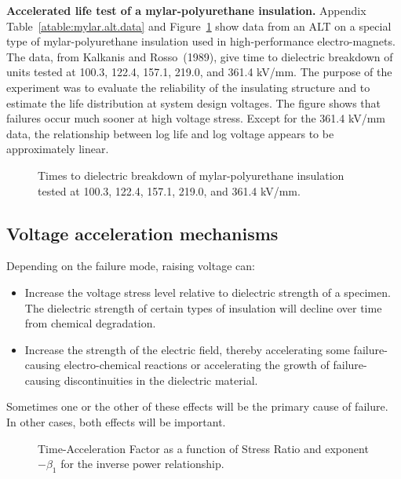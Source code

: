 \begin{example}{\bf Accelerated life test of a mylar-polyurethane
insulation.}
\label{example:mylar.voltage.data}
Appendix
Table~\ref{atable:mylar.alt.data} and
Figure~\ref{figure:mylarpoly.altplot.ps} show data from an ALT on a
special type of mylar-polyurethane insulation used in high-performance
electro-magnets. The data, from Kalkanis and Rosso~(1989), give time
to dielectric breakdown of units tested at 100.3, 122.4,
157.1, 219.0, and 361.4 kV/mm.  The purpose of the
experiment was to evaluate the reliability of the insulating structure
and to estimate the life distribution at system design voltages.  The
figure shows that failures occur much sooner at high voltage
stress. Except for the 361.4 kV/mm data, the relationship between
log life and log voltage appears to be approximately linear.
\begin{figure}
\caption{Times to dielectric breakdown of mylar-polyurethane
insulation tested at 100.3, 122.4, 157.1, 219.0, and 361.4 kV/mm.}
\label{figure:mylarpoly.altplot.ps}
\end{figure}
\end{example}

\subsection{Voltage acceleration mechanisms}
Depending on the failure mode, raising voltage can:
\begin{itemize}
\item
Increase the voltage stress level relative to
dielectric strength of a specimen. The dielectric strength of certain
types of insulation will decline over time from chemical degradation.
\item
Increase the strength of the electric field, thereby accelerating some
failure-causing electro-chemical reactions or accelerating the growth
of failure-causing discontinuities in the dielectric material.
\end{itemize}
Sometimes one or the other of these effects will be
the primary cause of failure.
In other cases, both effects will be important.
\begin{figure}
\caption{Time-Acceleration Factor as a function of Stress Ratio
and exponent $-\beta_{1}$ for the inverse power relationship.}
\label{figure:inverse.power.af.ps}
\end{figure}

